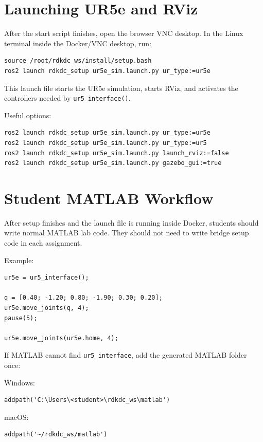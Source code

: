 \documentclass[11pt]{article}
\begin{document}
\section*{Launching UR5e and RViz}

After the start script finishes, open the browser VNC desktop. In the Linux terminal inside the Docker/VNC desktop, run:

\begin{Verbatim}
source /root/rdkdc_ws/install/setup.bash
ros2 launch rdkdc_setup ur5e_sim.launch.py ur_type:=ur5e
\end{Verbatim}

This launch file starts the UR5e simulation, starts RViz, and activates the controllers needed by \texttt{ur5\_interface()}.

Useful options:

\begin{Verbatim}
ros2 launch rdkdc_setup ur5e_sim.launch.py ur_type:=ur5e
ros2 launch rdkdc_setup ur5e_sim.launch.py ur_type:=ur5
ros2 launch rdkdc_setup ur5e_sim.launch.py launch_rviz:=false
ros2 launch rdkdc_setup ur5e_sim.launch.py gazebo_gui:=true
\end{Verbatim}

\section*{Student MATLAB Workflow}

After setup finishes and the launch file is running inside Docker, students should write normal MATLAB lab code. They should not need to write bridge setup code in each assignment.

Example:

\begin{Verbatim}
ur5e = ur5_interface();

q = [0.40; -1.20; 0.80; -1.90; 0.30; 0.20];
ur5e.move_joints(q, 4);
pause(5);

ur5e.move_joints(ur5e.home, 4);
\end{Verbatim}

If MATLAB cannot find \texttt{ur5\_interface}, add the generated MATLAB folder once:

Windows:
\begin{Verbatim}
addpath('C:\Users\<student>\rdkdc_ws\matlab')
\end{Verbatim}

macOS:
\begin{Verbatim}
addpath('~/rdkdc_ws/matlab')
\end{Verbatim}
\end{document}
